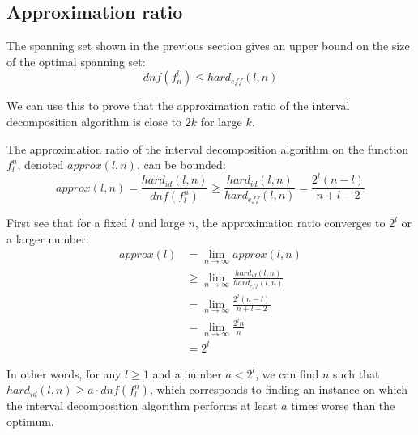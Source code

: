 \subsection{Approximation ratio}

The spanning set shown in the previous section
gives an upper bound on the size
of the optimal spanning set:
$$
\mathit{dnf}(f^l_n)
\leq \mathit{hard}_{\mathit{eff}}(l,n)
$$

We can use this to prove that the approximation ratio
of the interval decomposition algorithm is close to $2k$
for large $k$.

The approximation ratio
of the interval decomposition algorithm
on the function $f_l^n$,
denoted $\mathit{approx}(l,n)$,
can be bounded:
$$
\mathit{approx}(l,n)
= \frac{\mathit{hard}_{id}(l,n)}{\mathit{dnf}(f_l^n)}
\geq \frac{\mathit{hard}_{id}(l,n)}
{\mathit{hard}_{\mathit{eff}}(l,n)}
= \frac{2^l(n-l)}{n+l-2}
$$

First see that for a fixed $l$ and large $n$,
the approximation ratio converges to $2^l$
or a larger number:
\begin{align*}
\mathit{approx}(l)
&= \lim_{n \rightarrow \infty}{\mathit{approx}(l,n)} \\
&\geq \lim_{n \rightarrow \infty}
{\frac{\mathit{hard}_{\mathit{id}}(l,n)}
{\mathit{hard}_{\mathit{eff}}(l,n)}} \\
&= \lim_{n \rightarrow \infty}{\frac{2^l(n-l)}{n+l-2}} \\
&= \lim_{n \rightarrow \infty}{\frac{2^l n}{n}} \\
&= 2^l
\end{align*}

In other words,
for any $l \geq 1$ and a number $a < 2^l$,
we can find $n$ such that
$\mathit{hard}_{\mathit{id}}(l,n)
\geq a \cdot \mathit{dnf}(f_l^n)$,
which corresponds to finding an instance
on which the interval decomposition algorithm performs
at least $a$ times worse than the optimum.

